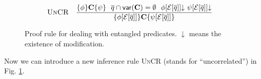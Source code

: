 \documentclass[conference,compsoc, 10pt]{IEEEtran}
\newcommand {\qbar} {{\overline{q}}}
\newcommand {\cE } {{\mathcal{E}}}
\newcommand{\Mexist}{{\downarrow}}
\newcommand {\var } {\mathsf{var}}
\newcommand {\prog } {{\mathbf{C}}}
\newcommand {\sem}[1] {\llbracket#1\rrbracket}
\begin{document}
	
	\begin{figure}\centering
		\begin{equation*}\begin{split}
		&\textsc{UnCR}\quad \frac{\{\phi\}\prog\{\psi\}\ \ \qbar\cap\var(\prog)=\emptyset\ \ \phi[\cE[\qbar]]\Mexist\ \psi[\cE[\qbar]]\Mexist}{\{\phi[\cE[\qbar]]\}\prog\{\psi[\cE[\qbar]]\}} 		
		\end{split}%
		\end{equation*}
		\caption{Proof rule for dealing with entangled predicates. $\Mexist$ means the existence of modification.
		}\label{fig proof system 3}
	\end{figure}
	
	Now we can introduce a new inference rule \textsc{UnCR} (stands for ``uncorrelated'') in Fig. \ref{fig proof system 3}. 
\end{document}
